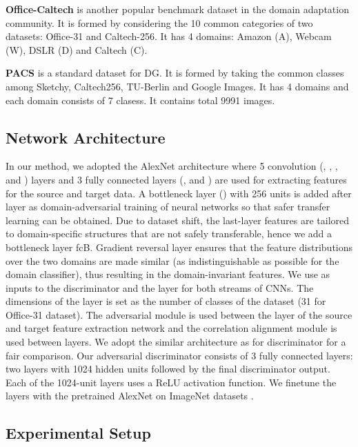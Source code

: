 \documentclass[review]{elsarticle}
\begin{document}
\textbf{ Office-Caltech} \cite{DBLP:conf/cvpr/GongSSG12} is another popular benchmark dataset in the domain adaptation community. It is formed by considering the 10 common categories of two datasets: Office-31 and Caltech-256. It has 4 domains: Amazon (A), Webcam (W), DSLR (D) and Caltech (C). 





\textbf{PACS} \cite{8237853} is a standard dataset for DG. It is formed by taking the common classes among Sketchy, Caltech256, TU-Berlin and Google Images. It has 4 domains and each domain consists of 7 clasess. It contains total 9991 images. 






\subsection{Network Architecture}

In our method, we adopted the AlexNet \cite{NIPS2012_4824} architecture where 5 convolution (, , ,  and ) layers and 3 fully connected layers (,  and ) are used for extracting features for the source and target data. A bottleneck layer () with 256 units is added after  layer as domain-adversarial training of neural
networks \cite{pmlr-v37-ganin15} so that safer transfer learning can be obtained. Due to dataset shift, the last-layer features are tailored to domain-specific structures that are not safely transferable, hence we add a bottleneck layer fcB. Gradient reversal layer ensures that the feature distributions over the two domains are made similar (as indistinguishable as possible for the domain classifier), thus resulting in the domain-invariant features. We use  as inputs to the discriminator and the  layer for both streams of CNNs. The dimensions of the  layer is set as the number of classes of the dataset (31 for Office-31 dataset). The adversarial module is used between the  layer of the source and target feature extraction network and the correlation alignment module is used between  layers. We adopt the similar architecture as \cite{pmlr-v37-ganin15} for discriminator for a fair comparison. Our adversarial discriminator consists of 3 fully connected layers: two layers with 1024 hidden units followed by the final discriminator output. Each of the 1024-unit layers uses a ReLU activation function. We finetune the  layers with the pretrained AlexNet on ImageNet datasets \cite{imagenet_cvpr09}.


\subsection{Experimental Setup}
\end{document}
